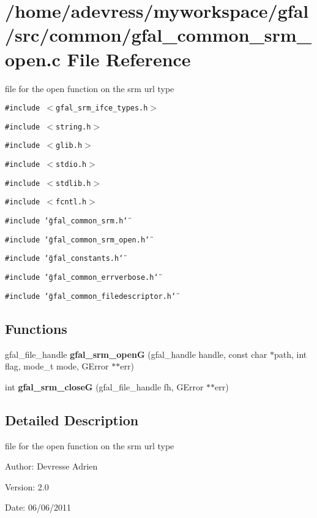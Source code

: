 \section{/home/adevress/myworkspace/gfal/src/common/gfal\_\-common\_\-srm\_\-open.c File Reference}
\label{gfal__common__srm__open_8c}
file for the open function on the srm url type 

{\tt \#include $<$gfal\_\-srm\_\-ifce\_\-types.h$>$}\par
{\tt \#include $<$string.h$>$}\par
{\tt \#include $<$glib.h$>$}\par
{\tt \#include $<$stdio.h$>$}\par
{\tt \#include $<$stdlib.h$>$}\par
{\tt \#include $<$fcntl.h$>$}\par
{\tt \#include \char`\"{}gfal\_\-common\_\-srm.h\char`\"{}}\par
{\tt \#include \char`\"{}gfal\_\-common\_\-srm\_\-open.h\char`\"{}}\par
{\tt \#include \char`\"{}gfal\_\-constants.h\char`\"{}}\par
{\tt \#include \char`\"{}gfal\_\-common\_\-errverbose.h\char`\"{}}\par
{\tt \#include \char`\"{}gfal\_\-common\_\-filedescriptor.h\char`\"{}}\par
\subsection*{Functions}
\begin{CompactItemize}
\item 
gfal\_\-file\_\-handle \textbf{gfal\_\-srm\_\-open\-G} (gfal\_\-handle handle, const char $\ast$path, int flag, mode\_\-t mode, GError $\ast$$\ast$err)\label{gfal__common__srm__open_8c_bb27bc48091a2a9a4ca124a35d3847a5}

\item 
int \textbf{gfal\_\-srm\_\-close\-G} (gfal\_\-file\_\-handle fh, GError $\ast$$\ast$err)\label{gfal__common__srm__open_8c_1b78856858fbfc8244d098fef0231d7d}

\end{CompactItemize}


\subsection{Detailed Description}
file for the open function on the srm url type 

\begin{Desc}
\item[Author:]Devresse Adrien \end{Desc}
\begin{Desc}
\item[Version:]2.0 \end{Desc}
\begin{Desc}
\item[Date:]06/06/2011 \end{Desc}
